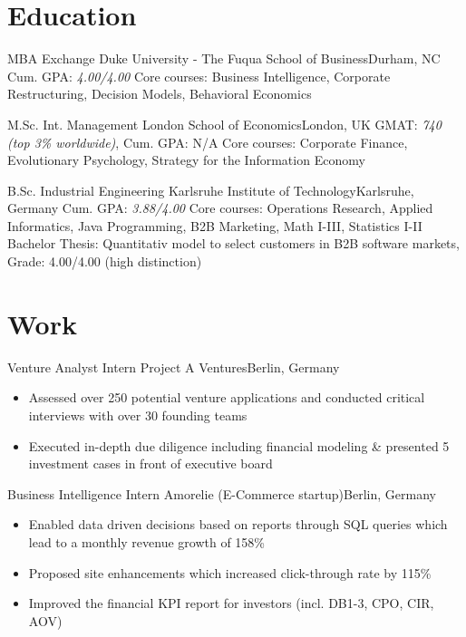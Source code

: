 \documentclass{my_cv}
\begin{document}
\makecvtitle

\section{Education}

{MBA Exchange}
{Duke University - The Fuqua School of Business}{Durham, NC}
{Cum. GPA: \textit{4.00/4.00}}
{Core courses: Business Intelligence, Corporate Restructuring, Decision Models, Behavioral Economics}  %

{M.Sc. Int. Management}
{London School of Economics}{London, UK}
{GMAT: \textit{740 (top 3\% worldwide)}, Cum. GPA: N/A}
{Core courses: Corporate Finance, Evolutionary Psychology, Strategy for the Information Economy}  %

{B.Sc. Industrial Engineering}
{Karlsruhe Institute of Technology}{Karlsruhe, Germany}
{Cum. GPA: \textit{3.88/4.00}}
{Core courses: Operations Research, Applied Informatics, Java Programming, B2B Marketing, Math I-III, Statistics I-II \\
Bachelor Thesis: Quantitativ model to select customers in B2B software markets, Grade: 4.00/4.00 (high distinction)
}  %

\section{Work}
{Venture Analyst Intern}
{Project A Ventures}{Berlin, Germany}
{}
{
\begin{itemize}
\item Assessed over 250 potential venture applications and conducted critical interviews with over 30 founding teams
\item Executed in-depth due diligence including financial modeling \& presented 5 investment cases in front of executive board
\end{itemize}
}  %

{Business Intelligence Intern}
{Amorelie (E-Commerce startup)}{Berlin, Germany}
{}
{
\begin{itemize}
\item Enabled data driven decisions based on reports through SQL queries which lead to a monthly revenue growth of 158\%
\item Proposed site enhancements which increased click-through rate by 115\%
\item Improved the financial KPI report for investors (incl. DB1-3, CPO, CIR, AOV)
\end{itemize}
}  %
\end{document}
